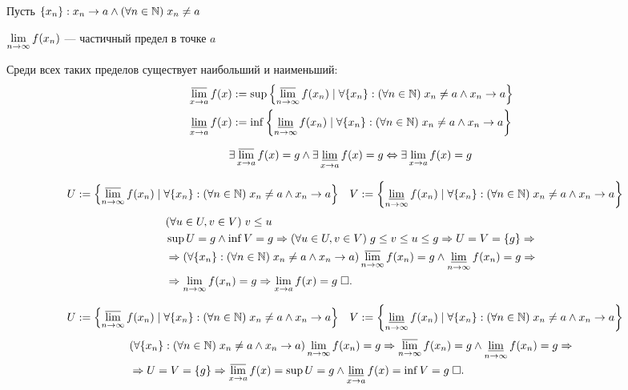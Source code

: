 \documentclass{article}
\begin{document}

\newcommand{\setdeff}[2]{\left\{#1\;|\;#2\right\}}


Пусть $\{x_{n}\}: x_{n}\to a\land(\forall n\in\mathbb{N})\;x_{n}\neq a$

$\lim\limits_{n\to\infty} f(x_{n})$ --- частичный предел в точке $a$

Среди всех таких пределов существует наибольший и наименьший:
\begin{align*}
	 & \slimsup{x\to a}f(x):=\sup\setdeff{\slimsup{n\to\infty}f(x_{n})}{\forall\{x_{n}\}:(\forall n\in\N)\;x_{n}\neq a\land x_{n}\to a} \\
	 & \sliminf{x\to a}f(x):=\inf\setdeff{\sliminf{n\to\infty}f(x_{n})}{\forall\{x_{n}\}:(\forall n\in\N)\;x_{n}\neq a\land x_{n}\to a}
\end{align*}

\theorem
\begin{align*}
	\exists\varlimsup\limits_{x\to a}f(x)=g\land\exists\varliminf\limits_{x\to a}f(x)=g\Leftrightarrow\exists\lim\limits_{x\to a}f(x)=g
\end{align*}

\onlyif
\begin{align*}
	 & U:=\setdeff{\slimsup{n\to\infty}f(x_{n})}{\forall\{x_{n}\}:(\forall n\in\N)\;x_{n}\neq a\land x_{n}\to a} &
	 & V:=\setdeff{\sliminf{n\to\infty}f(x_{n})}{\forall\{x_{n}\}:(\forall n\in\N)\;x_{n}\neq a\land x_{n}\to a}
\end{align*}
\begin{align*}
	 & (\forall u\in U,v\in V)\;v\leq u                                                                                                             \\
	 & \sup U =g\land\inf V=g\Rightarrow (\forall u\in U,v\in V)\;g\leq v\leq u\leq g\Rightarrow U=V=\{g\}\Rightarrow                                                 \\
	 & \Rightarrow (\forall\{x_{n}\}:(\forall n\in\mathbb{N})\;x_{n}\neq a\land x_{n}\to a)\varlimsup\limits_{n\to\infty}f(x_{n})=g\land\varliminf\limits_{n\to\infty}f(x_{n})=g\Rightarrow \\
	 & \Rightarrow\lim\limits_{n\to\infty} f(x_{n})=g\Rightarrow\lim\limits_{x\to a}f(x)=g\;\square.
\end{align*}

\enough
\begin{align*}
	 & U:=\setdeff{\slimsup{n\to\infty}f(x_{n})}{\forall\{x_{n}\}:(\forall n\in\N)\;x_{n}\neq a\land x_{n}\to a} &
	 & V:=\setdeff{\sliminf{n\to\infty}f(x_{n})}{\forall\{x_{n}\}:(\forall n\in\N)\;x_{n}\neq a\land x_{n}\to a}
\end{align*}
\begin{align*}
	&(\forall\{x_{n}\}:(\forall n\in\mathbb{N})\;x_{n}\neq a\land x_{n}\to a)\lim\limits_{n\to\infty} f(x_{n})=g\Rightarrow \varlimsup\limits_{n\to\infty}f(x_{n})=g\land\varliminf\limits_{n\to\infty}f(x_{n})=g\Rightarrow\\
	&\Rightarrow U=V=\{g\}\Rightarrow\varlimsup\limits_{x\to a}f(x)=\sup U=g\land\varliminf\limits_{x\to a}f(x)=\inf V=g\;\square.
\end{align*}
\end{document}
